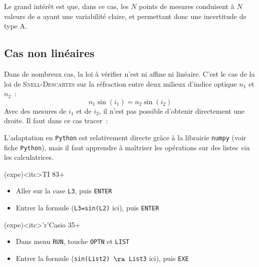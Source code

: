 \documentclass[a4paper, 12pt, garamond]{book}
\begin{document}
Le grand intérêt est que, dans ce cas, les $N$ points de mesures conduisent à
$N$ valeurs de $a$ ayant une variabilité claire, et permettant donc une
incertitude de type A.

\subsection{Cas non linéaires}
Dans de nombreux cas, la loi à vérifier n'est ni affine ni linéaire. C'est le
cas de la loi de \textsc{Snell}-\textsc{Descartes} sur la réfraction entre deux
milieux d'indice optique $n_1$ et $n_2$~:
\[
	n_1\sin(i_1) = n_2\sin(i_2)
\]
Avec des mesures de $i_1$ et de $i_2$, il n'est pas possible d'obtenir
directement une droite. Il faut dans ce cas tracer~:
%
\vspace{15pt}

L'adaptation en \texttt{Python} est relativement directe grâce à la librairie
\texttt{numpy} (voir fiche \texttt{Python}), mais il faut apprendre à maîtriser
les opérations sur des listes \textit{via} les calculatrices.
\begin{tcbraster}[raster columns=2, raster equal height=rows]
	\begin{tcn}(expe)<itc>{TI 83+}
		\begin{itemize}[leftmargin=10pt]
			\item Aller sur la case \texttt{L3}, puis \texttt{ENTER}
			\item Entrer la formule (\texttt{L3=sin(L2)} ici), puis \texttt{ENTER}
		\end{itemize}
	\end{tcn}
	\begin{tcn}(expe)<itc>'r'{Casio 35+}
		\begin{itemize}[leftmargin=10pt]
			\item Dans menu \texttt{RUN}, touche \texttt{OPTN} et \texttt{LIST}
			\item Entrer la formule (\texttt{sin(List2) $\ra$ List3} ici), puis
			      \texttt{EXE}
		\end{itemize}
	\end{tcn}
\end{tcbraster}
\end{document}

